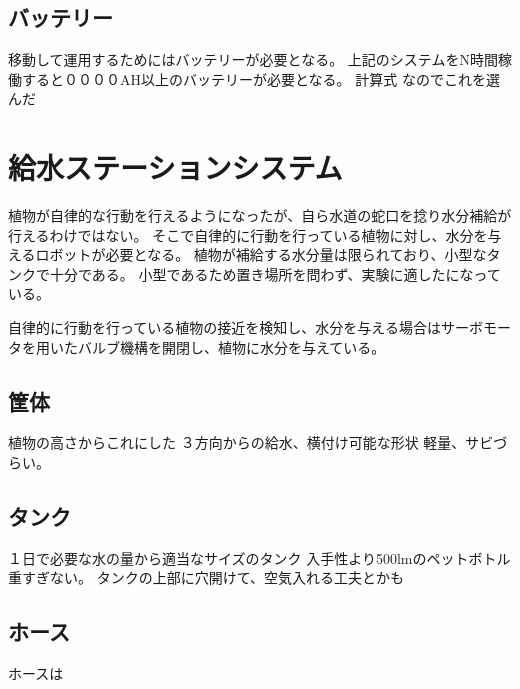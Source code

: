 \subsection{バッテリー}
移動して運用するためにはバッテリーが必要となる。
上記のシステムをN時間稼働すると００００AH以上のバッテリーが必要となる。
計算式
なのでこれを選んだ

\section{給水ステーションシステム}
植物が自律的な行動を行えるようになったが、自ら水道の蛇口を捻り水分補給が行えるわけではない。
そこで自律的に行動を行っている植物に対し、水分を与えるロボットが必要となる。
植物が補給する水分量は限られており、小型なタンクで十分である。
小型であるため置き場所を問わず、実験に適したになっている。
\par 自律的に行動を行っている植物の接近を検知し、水分を与える場合はサーボモータを用いたバルブ機構を開閉し、植物に水分を与えている。

\subsection{筐体}
植物の高さからこれにした
３方向からの給水、横付け可能な形状
軽量、サビづらい。

\subsection{タンク}
１日で必要な水の量から適当なサイズのタンク
入手性より500lmのペットボトル
重すぎない。
タンクの上部に穴開けて、空気入れる工夫とかも

\subsection{ホース}
ホースは
